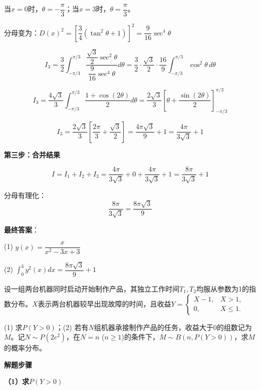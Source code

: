 \documentclass[standard]{ExBook}
\begin{document}
\begin{qitems}
\begin{bbox}
\begin{solution}
            当$x=0$时，$\theta = -\dfrac{\pi}{3}$；当$x=3$时，$\theta = \dfrac{\pi}{3}$。
            
            分母变为：$D(x)^2 = \left[\dfrac{3}{4}(\tan^2\theta + 1)\right]^2 = \dfrac{9}{16}\sec^4\theta$
            
            $$I_3 = \frac{3}{2}\int_{-\pi/3}^{\pi/3} \frac{\dfrac{\sqrt{3}}{2}\sec^2\theta}{\dfrac{9}{16}\sec^4\theta} d\theta = \frac{3}{2} \cdot \frac{\sqrt{3}}{2} \cdot \frac{16}{9}\int_{-\pi/3}^{\pi/3} \cos^2\theta\, d\theta$$
            
            $$I_3 = \frac{4\sqrt{3}}{3}\int_{-\pi/3}^{\pi/3} \frac{1+\cos(2\theta)}{2} d\theta = \frac{2\sqrt{3}}{3}\left[\theta + \frac{\sin(2\theta)}{2}\right]_{-\pi/3}^{\pi/3}$$
            
            $$I_3 = \frac{2\sqrt{3}}{3}\left[\frac{2\pi}{3} + \frac{\sqrt{3}}{2}\right] = \frac{4\pi\sqrt{3}}{9} + 1 = \frac{4\pi}{3\sqrt{3}} + 1$$
            
            \textbf{第三步：合并结果}
            
            $$I = I_1 + I_2 + I_3 = \frac{4\pi}{3\sqrt{3}} + 0 + \frac{4\pi}{3\sqrt{3}} + 1 = \frac{8\pi}{3\sqrt{3}} + 1$$
            
            分母有理化：
            $$\frac{8\pi}{3\sqrt{3}} = \frac{8\pi\sqrt{3}}{9}$$
            
            \textbf{最终答案}：
            
            (1) $y(x) = \dfrac{x}{x^2 - 3x + 3}$
            
            (2) $\int_0^3 y^2(x)dx = \dfrac{8\pi\sqrt{3}}{9} + 1$
        \end{solution}
    \end{bbox}

    \begin{bbox}
        \qitem 设一组两台机器同时启动开始制作产品，其独立工作时间$T_1, T_2$均服从参数为1的指数分布。$X$表示两台机器较早出现故障的时间，且收益$Y = \begin{cases} X-1, & X>1, \\ 0, & X \le 1. \end{cases}$
        
        (1) 求$P(Y>0)$；(2) 若有$N$组机器承接制作产品的任务，收益大于0的组数记为$M$。记$N \sim P(2e^2)$，在$N=n$ ($n\ge1$)的条件下，$M \sim B(n, P(Y>0))$，求$M$的概率分布。
        \begin{solution}
            \textbf{解题步骤}
            
            \textbf{（1）求$P(Y>0)$}
            

\end{solution}
\end{bbox}
\end{qitems}
\end{document}
